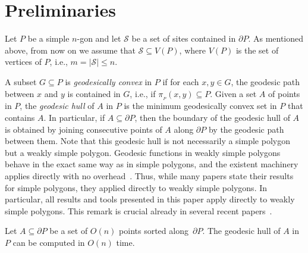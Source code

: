 \documentclass[a4paper,UKenglish]{socg-lipics-v2018}
\newcommand{\s}{\mathcal S}
\newcommand{\p}[3][P]{\ensuremath{\pi_{_{#1}}(#2, #3)}}
\newcommand{\cell}[2][P]{\ensuremath{\mathsf{Cell}_{\scriptscriptstyle #1}(#2)}}
\newcommand{\vd}[2][P]{\textsc{vd}(#2, #1)}
\begin{document}
\section{Preliminaries}
Let $P$ be a simple $n$-gon and let $\s$ be a set of sites contained in $\partial P$.
As mentioned above, from now on we assume that $\s\subseteq V(P)$, where $V(P)$ is the set of vertices of $P$, i.e.,  $m = |\s|\leq  n$.

A subset $G\subseteq P$ is \emph{geodesically convex} in $P$ if for each $x,y\in G$, the geodesic path between $x$ and $y$ is contained in $G$, i.e., if $\p{x}{y}\subseteq P$.
Given a set $A$ of points in $P$, the \emph{geodesic hull} of $A$ in $P$ is the minimum geodesically convex set in $P$ that contains $A$. 
In particular, if $A\subseteq \partial P$, then the boundary of the geodesic hull of $A$ is obtained by joining consecutive points of $A$ along $\partial P$ by the geodesic path between them. Note that this geodesic hull is not necessarily a simple polygon but a weakly simple polygon. 
Geodesic functions in weakly simple polygons behave in the exact same way as in simple polygons, and the existent machinery applies directly with no overhead~\cite{chang2014detecting}. 
Thus, while many papers state their results for simple polygons, they applied directly to weakly simple polygons. In particular, all results and tools presented in this paper apply directly to weakly simple polygons.
This remark is crucial already in several recent papers~\cite{oh2016computing,oh2016farthest}.

\begin{lemma}\label{lemma:Geodesic hull computation}
Let $A\subseteq \partial P$ be a set of $O(n)$ points sorted along~$\partial P$. 
The geodesic hull of $A$ in $P$ can be computed in $O(n)$ time.
\end{lemma}

%
\end{document}
